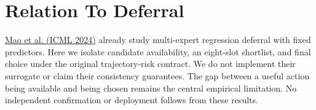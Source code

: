 \documentclass[10pt,onecolumn,letterpaper]{article}
\begin{document}
\section{Relation To Deferral}

\href{https://proceedings.mlr.press/v235/mao24d.html}{Mao et al. (ICML 2024)} already study multi-expert regression deferral with fixed predictors. Here we isolate candidate availability, an eight-slot shortlist, and final choice under the original trajectory-risk contract. We do not implement their surrogate or claim their consistency guarantees. The gap between a useful action being available and being chosen remains the central empirical limitation. No independent confirmation or deployment follows from these results.
\end{document}
